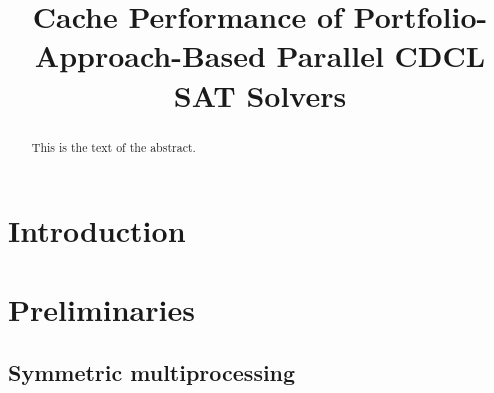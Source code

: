 \documentclass{article}
\begin{document}


 \newcommand{\assign}{$\,$:=$\;$}
\newcommand{\barc}{Barelogic$^S$}
\newcommand{\pling}{{\tt plingeling}}

\title{Cache Performance of Portfolio-Approach-Based Parallel CDCL SAT Solvers}




\maketitle
\begin{abstract}
This is the text of the abstract.
\end{abstract}

\tableofcontents

\section{Introduction}



\section{Preliminaries}
\label{sec:preliminaries}



\subsection{Symmetric multiprocessing}
\label{sec:march}
\end{document}
